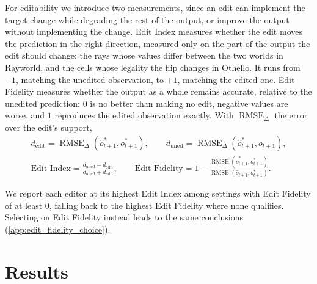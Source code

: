 \documentclass{article} %
\begin{document}
For editability we introduce two measurements, since an edit can implement the target change while degrading the rest of the output, or improve the output without implementing the change. Edit Index measures whether the edit moves the prediction in the right direction, measured only on the part of the output the edit should change: the rays whose values differ between the two worlds in Rayworld, and the cells whose legality the flip changes in Othello. It runs from $-1$, matching the unedited observation, to $+1$, matching the edited one. Edit Fidelity measures whether the output as a whole remains accurate, relative to the unedited prediction: $0$ is no better than making no edit, negative values are worse, and $1$ reproduces the edited observation exactly. With $\operatorname{RMSE}_{\Delta}$ the error over the edit's support,
\begin{equation}
\label{eq:editability_formulae}
\begin{gathered}
d_{\mathrm{edit}} = \operatorname{RMSE}_{\Delta}(\hat{o}_{t+1}^*, o_{t+1}^*), \qquad
d_{\mathrm{uned}} = \operatorname{RMSE}_{\Delta}(\hat{o}_{t+1}^*, o_{t+1}), \\[0.65em]
\text{Edit Index} = \frac{d_{\mathrm{uned}} - d_{\mathrm{edit}}}{d_{\mathrm{uned}} + d_{\mathrm{edit}}}, \qquad
\text{Edit Fidelity} = 1 - \frac{\operatorname{RMSE}(\hat{o}_{t+1}^*, o_{t+1}^*)}{\operatorname{RMSE}(\hat{o}_{t+1}, o_{t+1}^*)}.
\end{gathered}
\end{equation}

We report each editor at its highest Edit Index among settings with Edit Fidelity of at least $0$, falling back to the highest Edit Fidelity where none qualifies. Selecting on Edit Fidelity instead leads to the same conclusions (\cref{app:edit_fidelity_choice}).



\section{Results}
\label{sec:results}

\end{document}
